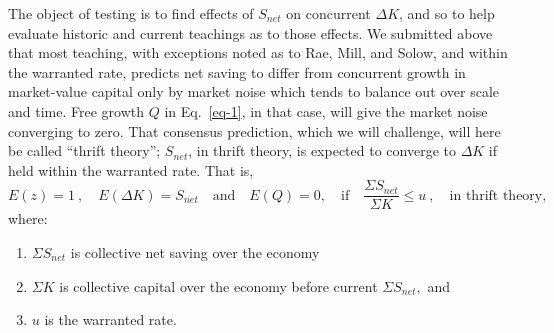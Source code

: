 \documentclass[a4paper,fleqn]{latex_styles/cas-sc}
\begin{document}
The object of testing is to find effects of \(S_{net}\) on concurrent
\(\Delta K\), and so to help evaluate historic and current teachings as
to those effects. We submitted above that most teaching, with exceptions
noted as to Rae, Mill, and Solow, and within the warranted rate,
predicts net saving to differ from concurrent growth in market-value
capital only by market noise which tends to balance out over scale and
time. Free growth \(Q\) in Eq.~\eqref{eq-1}, in that case, will give
the market noise converging to zero. That consensus prediction, which we
will challenge, will here be called ``thrift theory''; \(S_{net}\), in
thrift theory, is expected to converge to \(\Delta K\) if held within
the warranted rate. That is,
%
\begin{equation}
    E(z) = 1\ , \quad E(\Delta K) = S_{net} \quad \text{and} \quad E(Q) = 0,
\quad \text{if} \quad
\frac{\Sigma S_{net}}{\Sigma K} \leq u\ ,\quad \text{in thrift theory,}
\label{eq-2}
\end{equation}
%
where:

\begin{enumerate}
\def\labelenumi{\arabic{enumi}.}
\item
  \(\Sigma S_{net}\) is collective net saving over the economy
\item
  \(\Sigma K\) is collective capital over the economy before current
  \(\Sigma S_{net},\) and
\item
  \(u\) is the warranted rate.
\end{enumerate}
\end{document}

